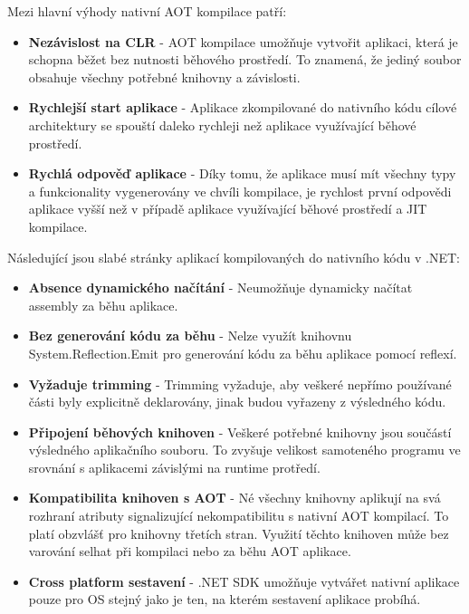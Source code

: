 Mezi hlavní výhody nativní AOT kompilace patří:

\begin{itemize}
    \item  \textbf{Nezávislost na CLR} - AOT kompilace umožňuje vytvořit aplikaci, která je schopna běžet bez nutnosti běhového prostředí. To znamená, že jediný soubor obsahuje všechny potřebné knihovny a závislosti.
    \item \textbf{Rychlejší start aplikace} - Aplikace zkompilované do nativního kódu cílové architektury se spouští daleko rychleji než aplikace využívající běhové prostředí.
    \item \textbf{Rychlá odpověď aplikace} - Díky tomu, že aplikace musí mít všechny typy a funkcionality vygenerovány ve chvíli kompilace, je rychlost první odpovědi aplikace vyšší než v případě aplikace využívající běhové prostředí a JIT kompilace.
\end{itemize}

Následující jsou slabé stránky aplikací kompilovaných do nativního kódu v .NET:

\begin{itemize}
    \item \textbf{Absence dynamického načítání} - Neumožňuje dynamicky načítat assembly za běhu aplikace.
    \item \textbf{Bez generování kódu za běhu} - Nelze využít knihovnu System.Reflection.Emit pro generování kódu za běhu aplikace pomocí reflexí.
    \item \textbf{Vyžaduje trimming} - Trimming vyžaduje, aby veškeré nepřímo používané části byly explicitně deklarovány, jinak budou vyřazeny z výsledného kódu.
    \item \textbf{Připojení běhových knihoven} - Veškeré potřebné knihovny jsou součástí výsledného aplikačního souboru. To zvyšuje velikost samoteného programu ve srovnání s aplikacemi závislými na runtime protředí.
    \item \textbf{Kompatibilita knihoven s AOT} - Né všechny knihovny aplikují na svá rozhraní atributy signalizující nekompatibilitu s nativní AOT kompilací. To platí obzvlášť pro knihovny třetích stran. Využití těchto knihoven může bez varování selhat při kompilaci nebo za běhu AOT aplikace.
    \item \textbf{Cross platform sestavení} - .NET SDK umožňuje vytvářet nativní aplikace pouze pro OS stejný jako je ten, na kterém sestavení aplikace probíhá.
\end{itemize}

